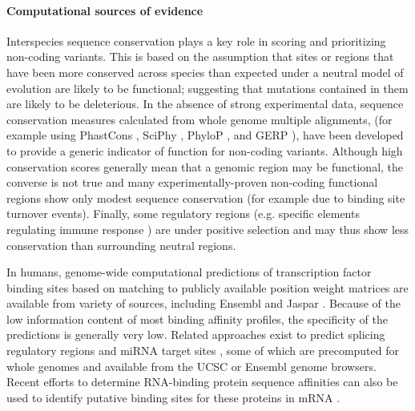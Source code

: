 \paragraph{Computational sources of evidence} 
Interspecies sequence conservation plays a key role in scoring and prioritizing non-coding variants. 
This is based on the assumption that sites or regions that have been more conserved across species than expected under a neutral model of evolution are likely to be functional; suggesting that mutations contained in them are likely to be deleterious. 
In the absence of strong experimental data, sequence conservation measures calculated from whole genome multiple alignments, (for example using PhastCons \cite{siepel2005evolutionarily}, SciPhy \cite{garber2009identifying}, PhyloP \cite{pollard2010detection}, and GERP  \cite{davydov2010identifying}), have been developed to provide a generic indicator of function for non-coding variants. 
Although high conservation scores generally mean that a genomic region may be functional, the converse is not true and many experimentally-proven non-coding functional regions show only modest sequence conservation (for example due to binding site turnover events). 
Finally, some regulatory regions (e.g. specific elements regulating immune response  \cite{raj2013common}) are under positive selection and may thus show less conservation than surrounding neutral regions. 

In humans, genome-wide computational predictions of transcription factor binding sites based on matching to publicly available position weight matrices are available from variety of sources, including Ensembl \cite{flicek2012ensembl} and Jaspar  \cite{bryne2008jaspar}.  Because of the low information content of most binding affinity profiles, the specificity of the predictions is generally very low. Related approaches exist to predict splicing regulatory regions  \cite{fairbrother2002predictive} and miRNA target sites \cite{ziebarth2011polymirts}, some of which are precomputed for whole genomes and available from the UCSC or Ensembl genome browsers. Recent efforts to determine RNA-binding protein sequence affinities can also be used to identify putative binding sites for these proteins in mRNA  \cite{ray2013compendium}.

